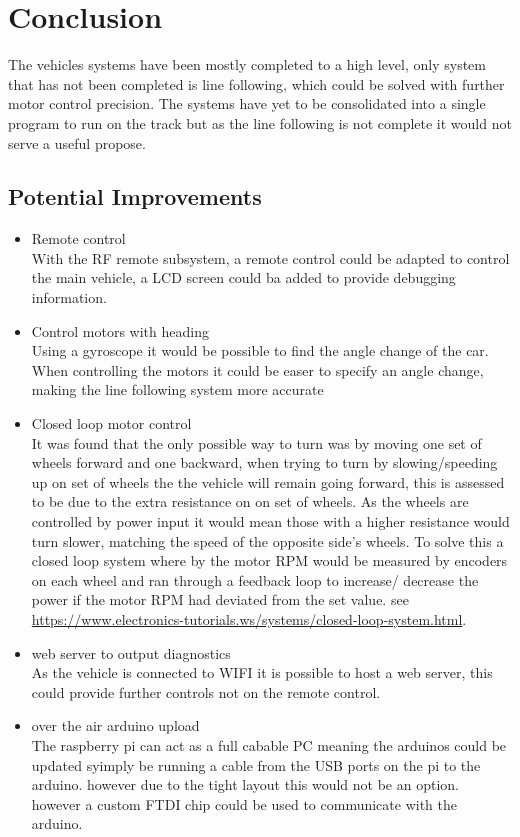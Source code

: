 		\chapter{Conclusion}

The vehicles systems have been mostly completed to a high level, only system that has not been completed is line following, which could be solved with further motor control precision. The systems have yet to be consolidated into a single program to run on the track but as the line following is not complete it would not serve a useful propose.     
	
	\section{Potential Improvements}
	
\begin{itemize}
\item Remote control \\ 
With the RF remote subsystem, a remote control could be adapted to control the main vehicle, a LCD screen could ba added to provide debugging information.  
\item Control motors with heading \\
Using a gyroscope it would be possible to find the angle change of the car. When controlling the motors it could be easer to specify an angle change, making the line following system more accurate  
\item Closed loop motor control \\
It was found that the only possible way to turn was by moving one set of wheels forward and one backward, when trying to turn by slowing/speeding up on set of wheels the the vehicle will remain going forward, this is assessed to be due to the extra resistance on on set of wheels. As the wheels are controlled by power input it would mean those with a higher resistance would turn slower, matching the speed of the opposite side's wheels. To solve this a closed loop system where by the motor RPM would be measured by encoders on each wheel and ran through a feedback loop to increase/ decrease the power if the motor RPM had deviated from the set value. 
see \url{https://www.electronics-tutorials.ws/systems/closed-loop-system.html}.
\item web server to output diagnostics \\
As the vehicle is connected to WIFI it is possible to host a web server, this could provide further controls not on the remote control.    
\item over the air arduino upload \\
The raspberry pi can act as a full cabable PC meaning the arduinos could be updated syimply be running a cable from the USB ports on the pi to the arduino. however due to the tight layout this would not be an option. however a custom FTDI chip could be used to communicate with the arduino. 
\end{itemize}
	
